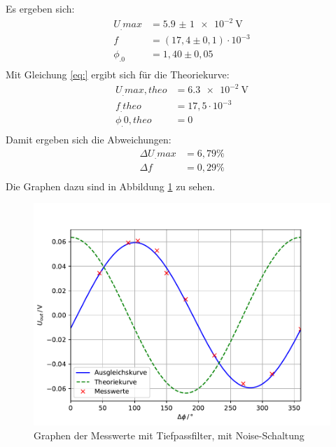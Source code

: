 Es ergeben sich:
\begin{align*}
U_.{max} &= \SI{5,9(1)e-2}{\volt} \\
f 		 &= (17,4\pm0,1)\cdot 10^{-3} \\
\phi_.0  &= 1,40\pm0,05 \\
\end{align*}
Mit Gleichung \eqref{eq:} ergibt sich für die Theoriekurve:
\begin{align*}
U_.{max,theo} &= \SI{6,3e-2}{\volt} \\
f_.{theo}	  &= 17,5\cdot 10^{-3} \\
\phi_.{0,theo}&= 0 \\
\end{align*}
Damit ergeben sich die Abweichungen:
\begin{align*}
\Delta U_.{max} &= 6,79\% \\
\Delta f		&= 0,29\% \\
\end{align*}
Die Graphen dazu sind in Abbildung \ref{fig:U4} zu sehen.
\begin{figure}
\centering
\includegraphics[width=\linewidth-75pt,height=\textheight-75pt,keepaspectratio]{content/images/plot2.pdf}
\caption{Graphen der Messwerte mit Tiefpassfilter, mit Noise-Schaltung}\label{fig:U4}
\end{figure}
